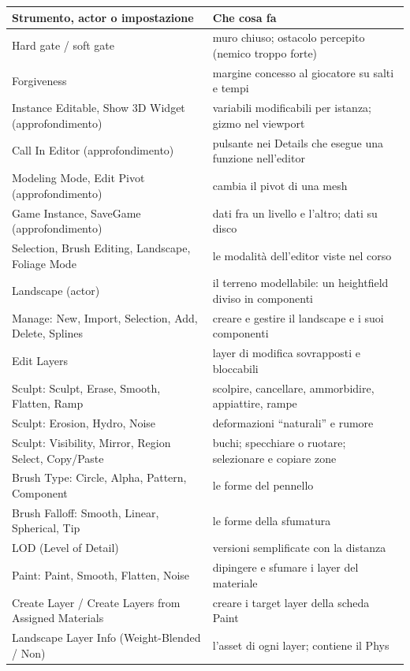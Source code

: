 \begin{table}[htbp]
\centering
\footnotesize
\begin{tabular}{@{}p{5.8cm}p{8.2cm}@{}}
\toprule
\textbf{Strumento, actor o impostazione} & \textbf{Che cosa fa} \\
\midrule
Hard gate / soft gate & muro chiuso; ostacolo percepito (nemico troppo forte) \\
Forgiveness & margine concesso al giocatore su salti e tempi \\
Instance Editable, Show 3D Widget (approfondimento) & variabili modificabili per istanza;
gizmo nel viewport \\
Call In Editor (approfondimento) & pulsante nei Details che esegue una funzione nell'editor \\
Modeling Mode, Edit Pivot (approfondimento) & cambia il pivot di una mesh \\
Game Instance, SaveGame (approfondimento) & dati fra un livello e l'altro; dati su disco \\
Selection, Brush Editing, Landscape, Foliage Mode & le modalità dell'editor viste nel corso \\
Landscape (actor) & il terreno modellabile: un heightfield diviso in componenti \\
Manage: New, Import, Selection, Add, Delete, Splines & creare e gestire il landscape e i suoi
componenti \\
Edit Layers & layer di modifica sovrapposti e bloccabili \\
Sculpt: Sculpt, Erase, Smooth, Flatten, Ramp & scolpire, cancellare, ammorbidire,
appiattire, rampe \\
Sculpt: Erosion, Hydro, Noise & deformazioni ``naturali'' e rumore \\
Sculpt: Visibility, Mirror, Region Select, Copy/Paste & buchi; specchiare o ruotare;
selezionare e copiare zone \\
Brush Type: Circle, Alpha, Pattern, Component & le forme del pennello \\
Brush Falloff: Smooth, Linear, Spherical, Tip & le forme della sfumatura \\
LOD (Level of Detail) & versioni semplificate con la distanza \\
Paint: Paint, Smooth, Flatten, Noise & dipingere e sfumare i layer del materiale \\
Create Layer / Create Layers from Assigned Materials & creare i target layer della scheda
Paint \\
Landscape Layer Info (Weight-Blended / Non) & l'asset di ogni layer; contiene il Phys

\end{tabular}
\end{table}

